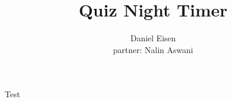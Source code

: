 \documentclass[12pt]{report}
\author{Daniel Eisen \\ partner: Nalin Aswani}
\title{Quiz Night Timer}
\begin{document}
\maketitle
Test
\end{document}
